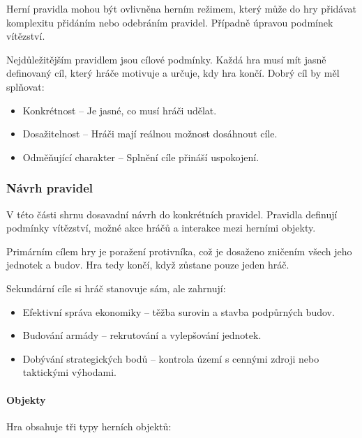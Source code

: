 Herní pravidla mohou být ovlivněna herním režimem, který může do hry přidávat komplexitu přidáním nebo odebráním pravidel. Případně úpravou podmínek vítězství.

Nejdůležitějším pravidlem jsou cílové podmínky. Každá hra musí mít jasně definovaný cíl, který hráče motivuje a určuje, kdy hra končí. Dobrý cíl by měl splňovat:

\begin{itemize}
    \item Konkrétnost -- Je jasné, co musí hráči udělat.
    \item Dosažitelnost -- Hráči mají reálnou možnost dosáhnout cíle.
    \item Odměňující charakter -- Splnění cíle přináší uspokojení.
\end{itemize}

\subsubsection{Návrh pravidel}

V této části shrnu dosavadní návrh do konkrétních pravidel. Pravidla definují podmínky vítězství, možné akce hráčů a interakce mezi herními objekty.

Primárním cílem hry je poražení protivníka, což je dosaženo zničením všech jeho jednotek a budov. Hra tedy končí, když zůstane pouze jeden hráč.

Sekundární cíle si hráč stanovuje sám, ale zahrnují:

\begin{itemize}
    \item Efektivní správa ekonomiky -- těžba surovin a stavba podpůrných budov.
    \item Budování armády -- rekrutování a vylepšování jednotek.
    \item Dobývání strategických bodů -- kontrola území s cennými zdroji nebo taktickými výhodami.
\end{itemize}

\paragraph{Objekty} Hra obsahuje tři typy herních objektů:

